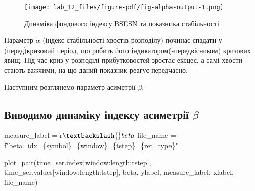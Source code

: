 \documentclass[
  letterpaper,
]{report}
\newenvironment{Shaded}{\begin{snugshade}}{\end{snugshade}}
\newcommand{\NormalTok}[1]{\textcolor[rgb]{0.00,0.23,0.31}{#1}}
\newcommand{\OperatorTok}[1]{\textcolor[rgb]{0.37,0.37,0.37}{#1}}
\newcommand{\SpecialCharTok}[1]{\textcolor[rgb]{0.37,0.37,0.37}{#1}}
\newcommand{\SpecialStringTok}[1]{\textcolor[rgb]{0.13,0.47,0.30}{#1}}
\newcommand{\VerbatimStringTok}[1]{\textcolor[rgb]{0.13,0.47,0.30}{#1}}
\begin{document}
\begin{figure}[H]

{\centering \texttt{[image: lab\_12\_files/figure-pdf/fig-alpha-output-1.png]}

}

\caption{\label{fig-alpha}Динаміка фондового індексу BSESN та показника
стабільності}

\end{figure}

Параметр \(\alpha\) (індекс стабільності хвостів розподілу) починає
спадати у (перед)кризовий період, що робить його
індикатором(-передвісником) кризових явищ. Під час криз у розподілі
прибутковостей зростає ексцес, а самі хвости стають важчими, на що даний
показник реагує передчасно.

Наступним розглянемо параметр асиметрії \(\beta\):

\hypertarget{ux432ux438ux432ux43eux434ux438ux43cux43e-ux434ux438ux43dux430ux43cux456ux43aux443-ux456ux43dux434ux435ux43aux441ux443-ux430ux441ux438ux43cux435ux442ux440ux456ux457-beta}{%
\subsection{\texorpdfstring{Виводимо динаміку індексу асиметрії
\(\beta\)}{Виводимо динаміку індексу асиметрії \textbackslash beta}}\label{ux432ux438ux432ux43eux434ux438ux43cux43e-ux434ux438ux43dux430ux43cux456ux43aux443-ux456ux43dux434ux435ux43aux441ux443-ux430ux441ux438ux43cux435ux442ux440ux456ux457-beta}}

\begin{Shaded}
\begin{Highlighting}[]
\NormalTok{measure\_label }\OperatorTok{=} \VerbatimStringTok{r\textquotesingle{}$\textbackslash{}beta$\textquotesingle{}}
\NormalTok{file\_name }\OperatorTok{=} \SpecialStringTok{f"beta\_idx\_}\SpecialCharTok{\{}\NormalTok{symbol}\SpecialCharTok{\}}\SpecialStringTok{\_}\SpecialCharTok{\{}\NormalTok{window}\SpecialCharTok{\}}\SpecialStringTok{\_}\SpecialCharTok{\{}\NormalTok{tstep}\SpecialCharTok{\}}\SpecialStringTok{\_}\SpecialCharTok{\{}\NormalTok{ret\_type}\SpecialCharTok{\}}\SpecialStringTok{"}
\end{Highlighting}
\end{Shaded}

\begin{Shaded}
\begin{Highlighting}[]
\NormalTok{plot\_pair(time\_ser.index[window:length:tstep],}
\NormalTok{          time\_ser.values[window:length:tstep],}
\NormalTok{          beta, }
\NormalTok{          ylabel, }
\NormalTok{          measure\_label,}
\NormalTok{          xlabel,}
\NormalTok{          file\_name)}
\end{Highlighting}
\end{Shaded}
\end{document}
